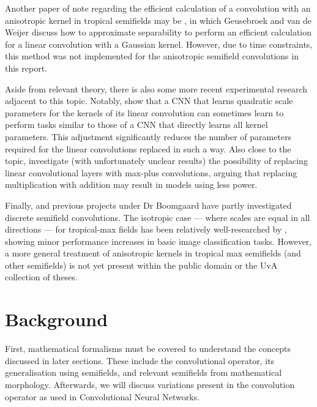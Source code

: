 \documentclass[a4paper, 12pt]{report}
\begin{document}
Another paper of note regarding the efficient calculation of a convolution with an anisotropic kernel in tropical semifields may be \cite{fastanifilter}, in which Geusebroek and van de Weijer discuss how to approximate separability to perform an efficient calculation for a linear convolution with a Gaussian kernel. However, due to time constraints, this method was not implemented for the anisotropic semifield convolutions in this report.

Aside from relevant theory, there is also some more recent experimental research adjacent to this topic. Notably, \cite{qlin1, qlin2} show that a CNN that learns quadratic scale parameters for the kernels of its linear convolution can sometimes learn to perform tasks similar to those of a CNN that directly learns all kernel parameters. This adjustment significantly reduces the number of  parameters required for the linear convolutions replaced in such a way. Also close to the topic, \cite{fan2021alternative} investigate (with unfortunately unclear results) the possibility of replacing linear convolutional layers with max-plus convolutions, arguing that replacing multiplication with addition may result in models using less power.

Finally, \cite{groenendijk2022morphpool} and previous projects under Dr Boomgaard have partly investigated discrete semifield convolutions. The isotropic case --- where scales are equal in all directions --- for tropical-max fields has been relatively well-researched by \cite{thierrybsc, koenbsc}, showing minor performance increases in basic image classification tasks. However, a more general treatment of anisotropic kernels in tropical max semifields (and other semifields) is not yet present within the public domain or the UvA collection of theses.

\chapter{Background}
First, mathematical formalisms must be covered to understand the concepts discussed in later sections. These include the convolutional operator, its generalisation using semifields, and relevant semifields from mathematical morphology. Afterwards, we will discuss variations present in the convolution operator as used in Convolutional Neural Networks.
\end{document}
